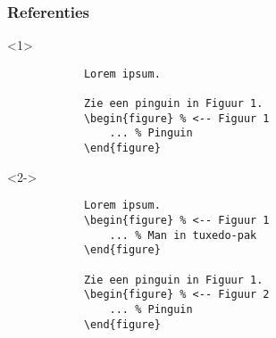 




\begin{frame}[fragile]
    \frametitle{Referenties}

    \unless\ifishandout
    \begin{onlyenv}<1>\relax
        \begin{verbatim}
            Lorem ipsum.

            Zie een pinguin in Figuur 1.
            \begin{figure} % <-- Figuur 1
                ... % Pinguin
            \end{figure}
        \end{verbatim}
    \end{onlyenv}
    \fi

    \begin{onlyenv}<2->\relax
        \begin{verbatim}
            Lorem ipsum.
            \begin{figure} % <-- Figuur 1
                ... % Man in tuxedo-pak
            \end{figure}

            Zie een pinguin in Figuur 1.
            \begin{figure} % <-- Figuur 2
                ... % Pinguin
            \end{figure}
        \end{verbatim}
    \end{onlyenv}
\end{frame}

